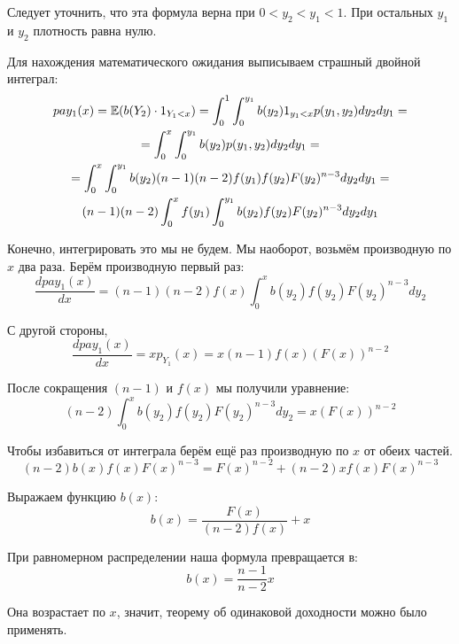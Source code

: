 \begin{myex}
Следует уточнить, что эта формула верна при $0<y_{2}<y_{1}<1$. При остальных $ y_{1} $ и $ y_{2} $ плотность равна нулю.

Для нахождения математического ожидания выписываем страшный двойной интеграл:
\begin{multline}
pay_{1}(x)=\operatorname{\mathbb{E}}(b(Y_{2})\cdot 1_{Y_{1}<x})=\int_{0}^{1}\int_{0}^{y_{1}} b(y_{2})1_{y_{1}<x} p(y_{1},y_{2})dy_{2}dy_{1}=\\
=\int_{0}^{x}\int_{0}^{y_{1}} b(y_{2})p(y_{1},y_{2})dy_{2}dy_{1}=\\
=\int_{0}^{x}\int_{0}^{y_{1}} b(y_{2}) (n-1)(n-2)f(y_{1})f(y_{2})F(y_{2})^{n-3} dy_{2}dy_{1}=\\
(n-1)(n-2)\int_{0}^{x}f(y_{1})\int_{0}^{y_{1}} b(y_{2}) f(y_{2})F(y_{2})^{n-3} dy_{2}dy_{1}
\end{multline}

Конечно, интегрировать это мы не будем. Мы наоборот, возьмём производную по $x$ два раза. Берём производную первый раз:
\begin{equation}
\frac{dpay_{1}(x)}{dx}=(n-1)(n-2)f(x)\int_{0}^{x} b(y_{2}) f(y_{2})F(y_{2})^{n-3} dy_{2}
\end{equation}

С другой стороны,
\begin{equation}
\frac{dpay_{1}(x)}{dx}=xp_{Y_{1}}(x)=x(n-1)f(x)(F(x))^{n-2}
\end{equation}

После сокращения $ (n-1) $ и $ f(x) $ мы получили уравнение:
\begin{equation}
(n-2)\int_{0}^{x} b(y_{2}) f(y_{2})F(y_{2})^{n-3} dy_{2}=x(F(x))^{n-2}
\end{equation}

Чтобы избавиться от интеграла берём ещё раз производную по $ x $ от обеих частей.
\begin{equation}
(n-2) b(x) f(x)F(x)^{n-3}=F(x)^{n-2}+(n-2)xf(x)F(x)^{n-3}
\end{equation}

Выражаем функцию $ b(x) $:
\begin{equation}
b(x)=\frac{F(x)}{(n-2)f(x)}+x
\end{equation}

При равномерном распределении наша формула превращается в:
\begin{equation}
b(x)=\frac{n-1}{n-2}x
\end{equation}

Она возрастает по $ x $, значит, теорему об одинаковой доходности можно было применять.
\end{myex}


